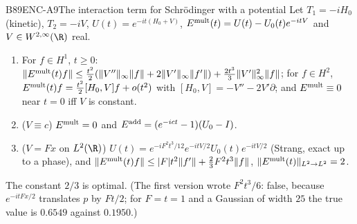 \begin{dimcard}{B89}{ENC-A9}{The interaction term for Schr\"odinger with a potential}{\proved}{}
Let $T_1=-iH_0$ (kinetic), $T_2=-iV$, $U(t)=e^{-it(H_0+V)}$, $E^{\rm mult}(t)=U(t)-U_0(t)e^{-itV}$ and $V\in W^{2,\infty}(\R)$ real.
\begin{enumerate}[label=(\alph*)]
\item For $f\in H^1$, $t\ge0$: $\|E^{\rm mult}(t)f\|\le\frac{t^2}2(\|V''\|_\infty\|f\|+2\|V'\|_\infty\|f'\|)+\frac{2t^3}3\|V'\|_\infty^2\|f\|$; for $f\in H^2$, $E^{\rm mult}(t)f=\frac{t^2}2[H_0,V]f+o(t^2)$ with $[H_0,V]=-V''-2V'\partial$; and $E^{\rm mult}\equiv0$ near $t=0$ iff $V$ is constant.
\item ($V\equiv c$) $E^{\rm mult}=0$ and $E^{\rm add}=(e^{-ict}-1)(U_0-I)$.
\item ($V=Fx$ on $L^2(\R)$) $U(t)=e^{-iF^2t^3/12}e^{-itV/2}U_0(t)e^{-itV/2}$ (Strang, exact up to a phase), and $\|E^{\rm mult}(t)f\|\le|F|t^2\|f'\|+\frac23F^2t^3\|f\|$, $\|E^{\rm mult}(t)\|_{L^2\to L^2}=2$.
\end{enumerate}
The constant $2/3$ is optimal. (The first version wrote $F^2t^3/6$: false, because $e^{-itFx/2}$ translates $p$ by $Ft/2$; for $F=t=1$ and a Gaussian of width $25$ the true value is $0.6549$ against $0.1950$.)
\end{dimcard}

